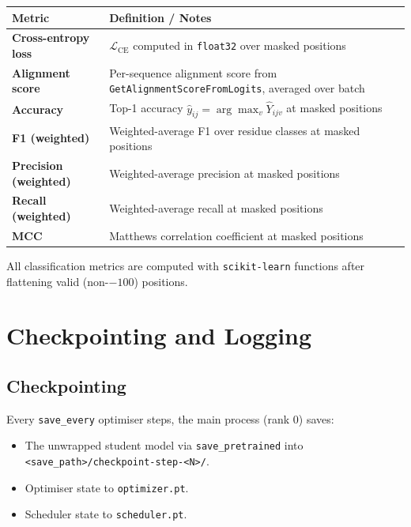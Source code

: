 \documentclass[11pt,a4paper]{article}
\begin{document}
\begin{center}
\begin{tabular}{ll}
\toprule
\textbf{Metric} & \textbf{Definition / Notes} \\
\midrule
\textbf{Cross-entropy loss} & $\mathcal{L}_{\mathrm{CE}}$ computed in \texttt{float32} over masked positions \\
\textbf{Alignment score}   & Per-sequence alignment score from \texttt{GetAlignmentScoreFromLogits}, averaged over batch \\
\textbf{Accuracy}          & Top-1 accuracy $\hat{y}_{ij} = \arg\max_v \hat{Y}_{ijv}$ at masked positions \\
\textbf{F1 (weighted)}     & Weighted-average F1 over residue classes at masked positions \\
\textbf{Precision (weighted)} & Weighted-average precision at masked positions \\
\textbf{Recall (weighted)} & Weighted-average recall at masked positions \\
\textbf{MCC}               & Matthews correlation coefficient at masked positions \\
\bottomrule
\end{tabular}
\end{center}

All classification metrics are computed with \texttt{scikit-learn} functions after flattening
valid (non-$-100$) positions.

\section{Checkpointing and Logging}

\subsection{Checkpointing}

Every \texttt{save\_every} optimiser steps, the main process (rank 0) saves:

\begin{itemize}
  \item The unwrapped student model via \texttt{save\_pretrained} into
        \texttt{<save\_path>/checkpoint-step-<N>/}.
  \item Optimiser state to \texttt{optimizer.pt}.
  \item Scheduler state to \texttt{scheduler.pt}.
\end{itemize}
\end{document}
